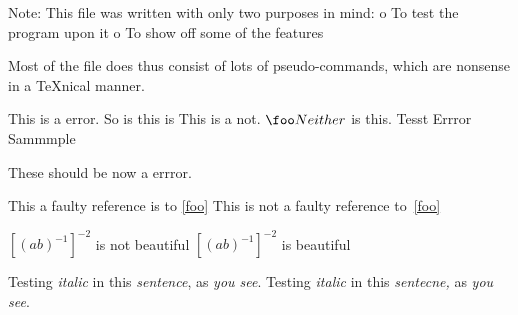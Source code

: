 Note: This file was written with only two purposes in mind:
    o To test the program upon it
    o To show off some of the features

Most of the file does thus consist of lots of pseudo-commands, which
are nonsense in a TeXnical manner.














\foo This is a error.
So is this is \foo
\smallskip This is a not. $\foo Neither$ is this.
Tesst
Errror
Sammmple

\startsection[title={Testing ConTeXt}]
These should be now a errror.
\stoptext


This a faulty reference is to \ref{foo}
This is not a faulty reference to~\ref{foo}


$[(ab)^{-1}]^{-2}$  is not beautiful
${{[{(ab)}^{-1}]}}^{-2}$ is beautiful


Testing {\it italic} in \/ this {\em sentence\/}, as {\em you \/ see\/}.
Testing {\it italic\/} in this {\em sentecne,} as {\em you see}.


